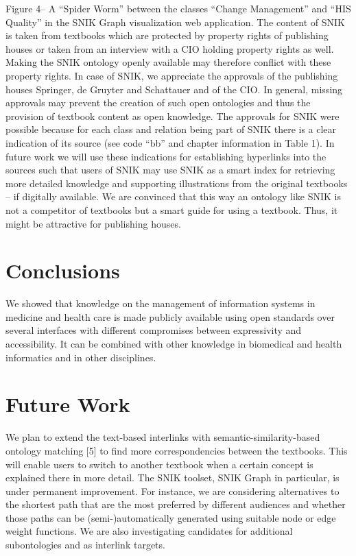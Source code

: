 \documentclass[sw]{iosart2x}
\begin{document}
Figure 4– A \enquote{Spider Worm} between the classes \enquote{Change Management} and \enquote{HIS Quality} in the SNIK Graph visualization web application.
The content of SNIK is taken from textbooks which are protected by property rights of publishing houses or taken from an interview with a CIO holding property rights as well. Making the SNIK ontology openly available may therefore conflict with these property rights. In case of SNIK, we appreciate the approvals of the publishing houses Springer, de Gruyter and Schattauer and of the CIO. In general, missing approvals may prevent the creation of such open ontologies and thus the provision of textbook content as open knowledge.
The approvals for SNIK were possible because for each class and relation being part of SNIK there is a clear indication of its source (see code \enquote{bb} and chapter information in Table 1). In future work we will use these indications for establishing hyperlinks into the sources such that users of SNIK may use SNIK as a smart index for retrieving more detailed knowledge and supporting illustrations from the original textbooks – if digitally available. We are convinced that this way an ontology like SNIK is not a competitor of textbooks but a smart guide for using a textbook. Thus, it might be attractive for publishing houses.


\section{Conclusions}
We showed that knowledge on the management of information systems in medicine and health care is made publicly available using open standards over several interfaces with different compromises between expressivity and accessibility. It can be combined with other knowledge in biomedical and health informatics and in other disciplines.

\section{Future Work}
We plan to extend the text-based interlinks with semantic-similarity-based ontology matching [5] to find more correspondencies between the textbooks. This will enable users to switch to another textbook when a certain concept is explained there in more detail. The SNIK toolset, SNIK Graph in particular, is under permanent improvement. For instance, we are considering alternatives to the shortest path that are the most preferred by different audiences and whether those paths can be (semi-)automatically generated using suitable node or edge weight functions. We are also investigating candidates for additional subontologies and as interlink targets.
\end{document}
